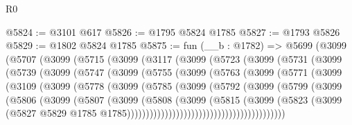 \begin{lexlean}{R0}
\begin{coremodule}
@5824 := @3101 @617
@5826 := @1795 @5824 @1785
@5827 := @1793 @5826
@5829 := @1802 @5824 @1785
@5875 := fun (__b : @1782) =>
  @5699
    (@3099
      (@5707
        (@3099
          (@5715
            (@3099
              (@3117
                (@3099
                  (@5723
                    (@3099
                      (@5731
                        (@3099
                          (@5739
                            (@3099
                              (@5747
                                (@3099
                                  (@5755
                                    (@3099
                                      (@5763
                                        (@3099
                                          (@5771
                                            (@3099
                                              (@3109
                                                (@3099
                                                  (@5778
                                                    (@3099
                                                      (@5785
                                                        (@3099
                                                          (@5792
                                                            (@3099
                                                              (@5799
                                                                (@3099
                                                                  (@5806
                                                                    (@3099
                                                                      (@5807
                                                                        (@3099
                                                                          (@5808
                                                                            (@3099
                                                                              (@5815
                                                                                (@3099
                                                                                  (@5823
                                                                                    (@3099
                                                                                      (@5827
                                                                                        @5829
                                                                                        @1785
                                                                                        @1785))))))))))))))))))))))))))))))))))))))))))

\end{coremodule}
\end{lexlean}
